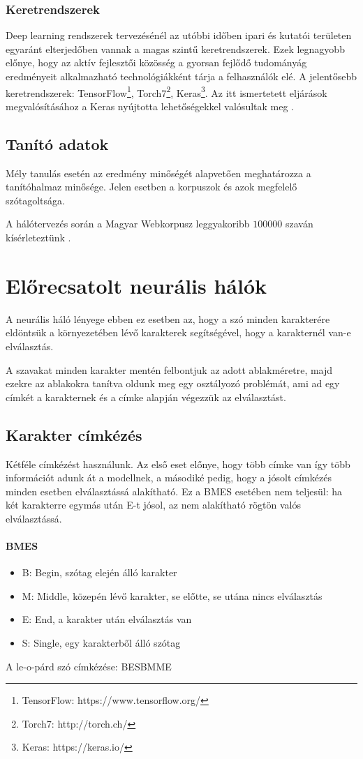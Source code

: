 \documentclass[a4paper, magyar]{article}
\begin{document}
\subsubsection{Keretrendszerek}
Deep learning rendszerek tervezésénél az utóbbi időben ipari és kutatói területen egyaránt elterjedőben vannak a magas szintű keretrendszerek. Ezek legnagyobb előnye, hogy az aktív fejlesztői közösség a gyorsan fejlődő tudományág eredményeit alkalmazható technológiákként tárja a felhasználók elé. A jelentősebb keretrendszerek: TensorFlow\footnote{TensorFlow: https://www.tensorflow.org/}, Torch7\footnote{Torch7: http://torch.ch/}, Keras\footnote{Keras: https://keras.io/}. Az itt ismertetett eljárások megvalósításához a Keras nyújtotta lehetőségekkel valósultak meg \cite{chollet2015keras}.
\subsection{Tanító adatok}
Mély tanulás esetén az eredmény minőségét alapvetően meghatározza a tanítóhalmaz minősége. Jelen esetben a korpuszok és azok megfelelő szótagoltsága.

A hálótervezés során a Magyar Webkorpusz leggyakoribb $100000$ szaván kísérleteztünk \cite{halacsy2004creating,kornai2006web}.
\section{Előrecsatolt neurális hálók}
A neurális háló lényege ebben ez esetben az, hogy a szó minden karakterére eldöntsük a környezetében lévő karakterek segítségével, hogy a karakternél van-e elválasztás.

A szavakat minden karakter mentén felbontjuk az adott ablakméretre, majd ezekre az ablakokra tanítva oldunk meg egy osztályozó problémát, ami ad egy címkét a karakternek és a címke alapján végezzük az elválasztást.
\subsection{Karakter címkézés}
Kétféle címkézést használunk. Az első eset előnye, hogy több címke van így több információt adunk át a modellnek, a másodiké pedig, hogy a jósolt címkézés minden esetben elválasztássá alakítható. Ez a BMES esetében nem teljesül: ha két karakterre egymás után E-t jósol, az nem alakítható rögtön valós elválasztássá. 
\paragraph{BMES}
\begin{itemize}
	\item B: Begin, szótag elején álló karakter
	\item M: Middle, közepén lévő karakter, se előtte, se utána nincs elválasztás
	\item E: End, a karakter után elválasztás van
	\item S: Single, egy karakterből álló szótag
\end{itemize}
A
{\selectfont
	le-o-párd%
}
szó címkézése:
{\selectfont
	BESBMME%
}
\end{document}
